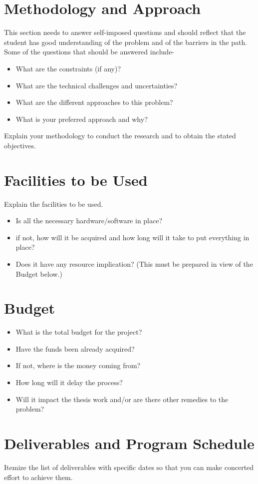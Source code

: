 \documentclass[a4paper,10pt]{article}
\begin{document}
\section{Methodology and Approach}
This section needs to answer self-imposed questions and should reflect that the student has good
understanding of the problem and of the barriers in the path. Some of the questions that should be
answered include-
\begin{itemize}
	\item What are the constraints (if any)?
	\item What are the technical challenges and uncertainties?
	\item What are the different approaches to this problem?
	\item What is your preferred approach and why?
\end{itemize}
Explain your methodology to conduct the research and to obtain the stated objectives.

\section{Facilities to be Used}
Explain the facilities to be used.
\begin{itemize}
	\item Is all the necessary hardware/software in place?
	\item if not, how will it be acquired and how long will it take to put everything in place?
	\item Does it have any resource implication? (This must be prepared in view of the Budget below.)
\end{itemize}

\section{Budget}
\begin{itemize}
	\item What is the total budget for the project?
	\item Have the funds been already acquired?
	\item If not, where is the money coming from?
	\item How long will it delay the process?
	\item Will it impact the thesis work and/or are there other remedies to the problem?
\end{itemize}
 
\section{Deliverables and Program Schedule}
Itemize the list of deliverables with specific dates so that you can make concerted effort to achieve them.
\end{document}
